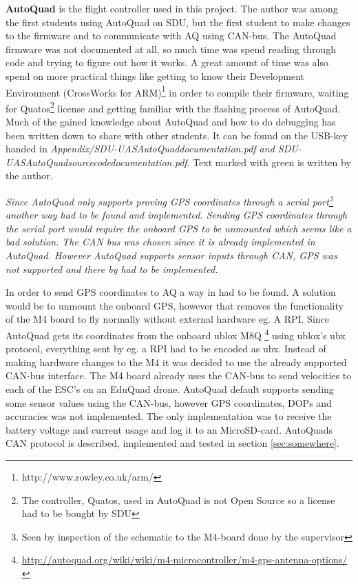 \textbf{AutoQuad} is the flight controller used in this project. The author was among the first students using AutoQuad on SDU, but the first student to make changes to the firmware and to communicate with AQ using CAN-bus. The AutoQuad firmware was not documented at all, so much time was spend reading through code and trying to figure out how it works. A great amount of time was also spend on more practical things like getting to know their Development Environment (CrossWorks for ARM)\footnote{http://www.rowley.co.uk/arm/} in order to compile their firmware, waiting for Quatos\footnote{The controller, Quatos,  used in AutoQuad is not Open Source so a license had to be bought by SDU} license and getting familiar with the flashing process of AutoQuad.\\
Much of the gained knowledge about AutoQuad and how to do debugging has been written down to share with other students. It can be found on the USB-key handed in \textit{Appendix/SDU-UASAutoQuaddocumentation.pdf and SDU-UASAutoQuadsourcecodedocumentation.pdf}. Text marked with green is written by the author.


\textit{Since AutoQuad only supports proving GPS coordinates through a serial port\footnote{Seen by inspection of the schematic to the M4-board done by the supervisor} another way had to be found and implemented.
Sending GPS coordinates through the serial port would require the onboard GPS to be unmounted which seems like a bad solution. The CAN bus was chosen since it is already implemented in AutoQuad. However AutoQuad supports sensor inputs through CAN, GPS was not supported and there by had to be implemented.}

In order to send GPS coordinates to AQ a way in had to be found. A solution would be to unmount the onboard GPS, however that removes the functionality of the M4 board to fly normally without external hardware eg. A RPI. Since AutoQuad gets its coordinates from the onboard ublox M8Q \footnote{\url{http://autoquad.org/wiki/wiki/m4-microcontroller/m4-gps-antenna-options/}} using ublox's ubx protocol, everything sent by eg. a RPI had to be encoded as ubx.
Instead of making hardware changes to the M4 it was decided to use the already supported CAN-bus interface. The M4 board already uses the CAN-bus to send velocities to each of the ESC's on an EduQuad drone. AutoQuad default supports sending some sensor values using the CAN-bus, however GPS coordinates, DOPs and accuracies was not implemented. The only implementation was to receive the battery voltage and current usage and log it to an MicroSD-card.
AutoQuads CAN protocol is described, implemented and tested in section \ref{sec:somewhere}.

